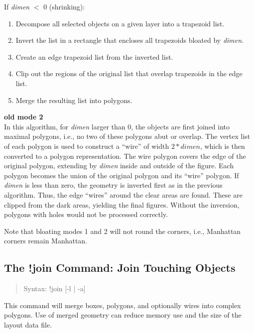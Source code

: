 \begin{description}
\begin{description}
\item{If {\it dimen} $<$ 0 (shrinking):}\\
\begin{enumerate}
\item{Decompose all selected objects on a given layer into a
trapezoid list.}
\item{Invert the list in a rectangle that encloses all trapezoids
bloated by {\it dimen}.}
\item{Create an edge trapezoid list from the inverted list.}
\item{Clip out the regions of the original list that overlap
trapezoids in the edge list.}
\item{Merge the resulting list into polygons.}
\end{enumerate}
\end{description}

\item{\bf old mode 2}\\
In this algorithm, for {\it dimen} larger than 0, the objects are
first joined into maximal polygons, i.e., no two of these polygons
abut or overlap.  The vertex list of each polygon is used to construct
a ``wire'' of width $2*dimen$, which is then converted to a polygon
representation.  The wire polygon covers the edge of the original
polygon, extending by {\it dimen} inside and outside of the figure. 
Each polygon becomes the union of the original polygon and its
``wire'' polygon.  If {\it dimen} is less than zero, the geometry is
inverted first as in the previous algorithm.  Thus, the edge ``wires''
around the clear areas are found.  These are clipped from the dark
areas, yielding the final figures.  Without the inversion, polygons
with holes would not be processed correctly.

Note that bloating modes 1 and 2 will not round the corners, i.e.,
Manhattan corners remain Manhattan.
\end{description}

\subsection{The {\cb !join} Command: Join Touching Objects}
\label{joincmd}
\begin{quote}
Syntax: {\vt !join} [{\vt -l} {\vt |} {\vt -a}]
\end{quote}

This command will merge boxes, polygons, and optionally wires into
complex polygons.  Use of merged geometry can reduce memory use and
the size of the layout data file.

